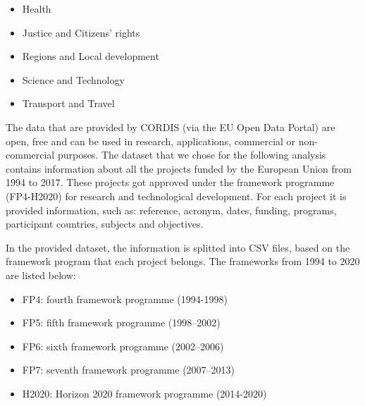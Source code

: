\documentclass[12pt]{report}
\begin{document}
\begin{itemize}
\item Health
\item Justice and Citizens’ rights
\item Regions and Local development
\item Science and Technology
\item Transport and Travel
\end{itemize}

The data that are provided by CORDIS (via the EU Open Data Portal) are open,
free and can be used in research, applications, commercial or non-commercial
purposes. The dataset that we chose for the following analysis contains
information about all the projects funded by the European Union from 1994 to
2017. These projects got approved under the framework programme (FP4-H2020) for
research and technological development. For each project it is provided
information, such as: reference, acronym, dates, funding, programs,
participant countries, subjects and objectives.

In the provided dataset, the information is splitted into CSV files, based on
the framework program that each project belongs. The frameworks from 1994 to
2020 are listed below:

\begin{itemize}
\item FP4: fourth framework programme (1994-1998)
\item FP5: fifth framework programme (1998–2002)
\item FP6: sixth framework programme (2002–2006)
\item FP7: seventh framework programme (2007–2013)
\item H2020: Horizon 2020 framework programme (2014-2020)
\end{itemize}
\end{document}
